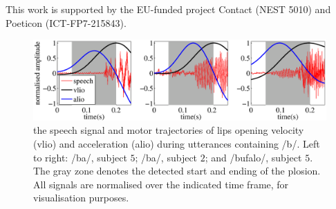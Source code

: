 \documentclass{pnastwo}
\newcommand{\vlio}{\textsf{vlio}}
\newcommand{\alio}{\textsf{alio}}
\begin{document}
\begin{article}
\begin{abstract}
\end{abstract}










\begin{acknowledgments}
  This work is supported by the EU-funded project Contact (NEST 5010) and Poeticon (ICT-FP7-215843).
\end{acknowledgments}


 

\end{article}


\begin{figure}[t]
  \centerline{\includegraphics[width=\textwidth]{figs/figSamples}}
  \caption{the speech signal and motor trajectories of lips opening
    velocity (\vlio) and acceleration (\alio) during utterances containing /b/.
    Left to right: /ba/, subject $5$; /ba/, subject $2$; and /bufalo/, subject $5$.
    The gray zone denotes the detected start and ending of the plosion. All signals
    are normalised over the indicated time frame, for visualisation purposes.}
  \label{fig:isdView}
\end{figure}
\end{document}
